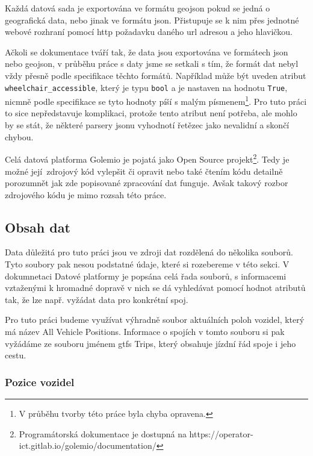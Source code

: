 Každá datová sada je exportována ve formátu \gls{geojson} pokud se jedná o geografická data, nebo jinak ve formátu \gls{json}. Přistupuje se k nim přes jednotné webové rozhraní pomocí \gls{http} požadavku daného \gls{url} adresou a jeho hlavičkou.

\bigbreak

Ačkoli se dokumentace tváří tak, že data jsou exportována ve formátech \gls{json} nebo \gls{geojson}, v průběhu práce s daty jsme se setkali s tím, že formát dat nebyl vždy přesně podle specifikace těchto formátů. Například může být uveden atribut \verb"wheelchair_accessible", který je typu \verb"bool" a je nastaven na hodnotu \verb"True", nicmně podle specifikace se tyto hodnoty píší s malým písmenem\footnote{V průběhu tvorby této práce byla chyba opravena.}. Pro tuto práci to sice nepředstavuje komplikaci, protože tento atribut není potřeba, ale mohlo by se stát, že některé parsery \gls{json}u vyhodnotí řetězec jako nevalidní a skončí chybou.

\bigbreak

Celá datová platforma Golemio je pojatá jako Open Source projekt\footnote{Programátorská dokumentace je dostupná na https://operator-ict.gitlab.io/golemio/documentation/}. Tedy je možné její zdrojový kód vylepšit či opravit nebo také čtením kódu detailně porozumnět jak zde popisované zpracování dat funguje. Avšak takový rozbor zdrojového kódu je mimo rozsah této práce.

\subsection{Obsah dat}

Data důležitá pro tuto práci jsou ve zdroji dat rozdělená do několika souborů. Tyto soubory pak nesou podstatné údaje, které si rozebereme v této sekci. V dokumnetaci Datové platformy je popsána celá řada souborů, s informacemi vztaženými k hromadné dopravě v nich se dá vyhledávat pomocí hodnot atributů tak, že lze např. vyžádat data pro konkrétní spoj.

\bigbreak

Pro tuto práci budeme využívat výhradně soubor aktuálních poloh vozidel, který má název All Vehicle Positions. Informace o spojích v tomto souboru si pak vyžádáme ze souboru jménem \gls{gtfs} Trips, který obsahuje jízdní řád spoje i jeho cestu.


\subsubsection{Pozice vozidel}

